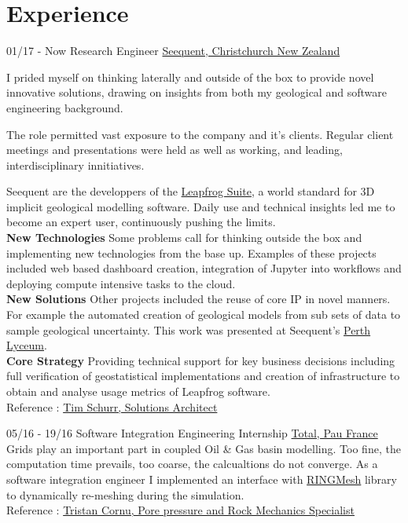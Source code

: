 \documentclass[]{friggeri-cv}
\begin{document}
\section{Experience}
\begin{entrylist}
  \entry
    {01/17 - Now}
    {Research Engineer}
    {\href{https://www.seequent.com/}{Seequent, Christchurch New Zealand}}
    {I prided myself on thinking laterally and outside of the box to provide novel innovative solutions, drawing on insights from both my geological and software engineering background.
    
    The role permitted vast exposure to the company and it's clients. Regular client meetings and presentations were held as well as working, and leading, interdisciplinary innitiatives.
    
    Seequent are the developpers of the \href{https://www.leapfrog3d.com/}{Leapfrog Suite}, a world standard for 3D implicit geological modelling software. Daily use and technical insights led me to become an expert user, continuously pushing the limits.
    \\[6pt]
   	\textbf{New Technologies} Some problems call for thinking outside the box and implementing new technologies from the base up. Examples of these projects included web based dashboard creation, integration of Jupyter into workflows and deploying compute intensive tasks to the cloud.
   	\\[6pt]
   	\textbf{New Solutions} Other projects included the reuse of core IP in novel manners. For example the automated creation of geological models from sub sets of data to sample geological uncertainty. This work was presented at Seequent's \href{https://lyceum-perth.seequent.com/}{Perth Lyceum}.
    \\[6pt]
   	\textbf{Core Strategy} Providing technical support for key business decisions including full verification of geostatistical implementations and creation of infrastructure to obtain and analyse usage metrics of Leapfrog software. 
    \\
    Reference : \href{mailto:tim.schurr@seequent.com}{Tim Schurr, Solutions Architect}
	}
  \entry
    {05/16 - 19/16}
    {Software Integration Engineering Internship}
    {\href{https://www.total.com/en}{Total, Pau France}}
    {Grids play an important part in coupled Oil \& Gas basin modelling. Too fine, the computation time prevails, too coarse, the calcualtions do not converge. As a software integration engineer I implemented an interface with \href{http://www.ring-team.org/software/ringmesh}{RINGMesh} library to dynamically re-meshing during the simulation.\\ Reference : \href{mailto:tristan.cornu@total.com}{Tristan Cornu, Pore pressure and Rock Mechanics Specialist}}

\end{entrylist}
\end{document}

